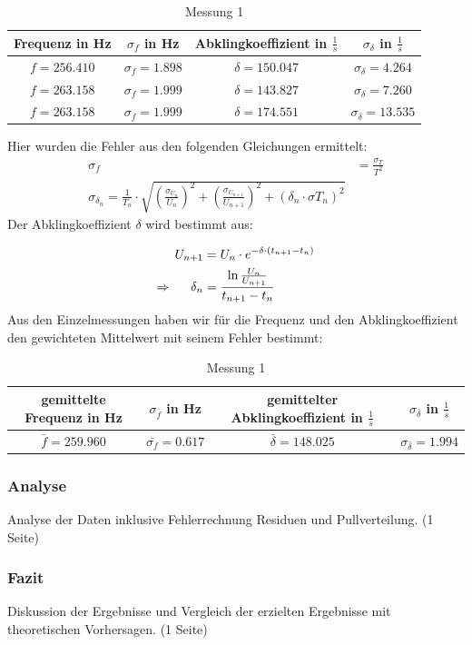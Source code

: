 \documentclass[12pt,a4paper]{article}
\begin{document}
\begin{table}[H]\centering
\caption{Messung 1}
\begin{tabular}{c|c|c|c}
Frequenz in Hz & $\sigma_f$ in Hz & Abklingkoeffizient in $\frac{1}{s}$ & $\sigma_{\delta}$ in $\frac{1}{s}$\\ 
\hline
$f=256.410$& $\sigma_f=1.898$& $\delta=150.047$& $\sigma_{\delta}=4.264$\\ 
$f=263.158$& $\sigma_f=1.999$& $\delta=143.827$& $\sigma_{\delta}=7.260$\\
$f=263.158$& $\sigma_f=1.999$& $\delta=174.551$& $\sigma_{\delta}=13.535$\\
\end{tabular} 
\end{table}
Hier wurden die Fehler aus den folgenden Gleichungen ermittelt:
\begin{align}
\sigma_f&=\frac{\sigma_T}{T^2}\\
\sigma_{\delta_n}=\frac{1}{T_n}\cdot \sqrt{(\frac{\sigma_{U_n}}{U_n})^2+(\frac{\sigma_{U_{n+1}}}{U_{n+1}})^2+(\delta_n\cdot \sigma{T_n})^2}
\end{align}
Der Abklingkoeffizient $\delta$ wird bestimmt aus:

\begin{align}
U_{n+1}&=U_n \cdot e^{-\delta \cdot (t_{n+1}-t_n)}\notag \\
\Rightarrow \hspace{0.5cm} \delta_n&=\frac{\ln{\frac{U_n}{U_{n+1}}}}{t_{n+1}-t_n}
\label{Peter}
\end{align}
\newline
Aus den Einzelmessungen haben wir für die Frequenz und den Abklingkoeffizient den gewichteten Mittelwert mit seinem Fehler bestimmt:

\begin{table}[H]\centering
\caption{Messung 1}
\begin{tabular}{c|c|c|c}
gemittelte Frequenz in Hz& $\sigma_{\bar{f}}$ in Hz & gemittelter Abklingkoeffizient in $\frac{1}{s}$ & $\sigma_{\bar{\delta}}$ in $\frac{1}{s}$\\ 
\hline
$\bar{f}=259.960$&$\bar{\sigma_f}= 0.617$& $\bar{\delta}=148.025$& $\sigma_{\bar{\delta}}=1.994$\\ 
\end{tabular} 
\end{table}
\newpage
\subsubsection{Analyse}
Analyse der Daten inklusive Fehlerrechnung Residuen und Pullverteilung. (1 Seite)
\subsubsection{Fazit}
Diskussion der Ergebnisse und Vergleich der erzielten Ergebnisse mit theoretischen Vorhersagen.
(1 Seite)
\end{document}
